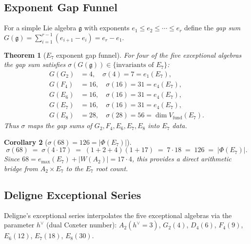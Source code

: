 \documentclass[11pt]{amsart}
\theoremstyle{plain}
\newtheorem{theorem}{Theorem}[section]
\newtheorem{corollary}[theorem]{Corollary}
\theoremstyle{definition}
\theoremstyle{remark}
\renewcommand{\Phi}{\varPhi}
\begin{document}
\subsection{Exponent Gap Funnel}\label{sec:exponent-gap}

For a simple Lie algebra $\mathfrak{g}$ with exponents
$e_1\le e_2\le\cdots\le e_r$ define the \emph{gap sum}
$G(\mathfrak{g})=\sum_{i=1}^{r-1}(e_{i+1}-e_i)=e_r-e_1$.

\begin{theorem}[$E_7$ exponent gap funnel]\label{thm:e7-funnel}
For four of the five exceptional algebras the gap sum satisfies
$\sigma(G(\mathfrak{g}))\in\{\text{invariants of }E_7\}$:
\begin{align*}
  G(G_2) &= 4,\quad \sigma(4)=7=e_1(E_7),\\
  G(F_4) &= 16,\quad \sigma(16)=31=e_4(E_7),\\
  G(E_6) &= 16,\quad \sigma(16)=31=e_4(E_7),\\
  G(E_7) &= 16,\quad \sigma(16)=31=e_4(E_7),\\
  G(E_8) &= 28,\quad \sigma(28)=56=\dim V_{\mathrm{fund}}(E_7).
\end{align*}
Thus $\sigma$ maps the gap sums of $G_2,F_4,E_6,E_7,E_8$ into $E_7$ data.
\end{theorem}

\begin{corollary}[$\sigma(68)=126=|\Phi(E_7)|$]\label{cor:sigma-68}
\[
  \sigma(68) \;=\; \sigma(4\cdot 17) \;=\; (1+2+4)(1+17) \;=\; 7\cdot 18 \;=\; 126 \;=\; |\Phi(E_7)|.
\]
Since $68=e_{\max}(E_7)+|W(A_2)|=17\cdot 4$, this provides a direct arithmetic
bridge from $A_2\times E_7$ to the $E_7$ root count.
\end{corollary}

\subsection{Deligne Exceptional Series}\label{sec:deligne}

Deligne's exceptional series interpolates the five exceptional algebras via
the parameter $h^{\vee}$ (dual Coxeter number):
$A_2(h^{\vee}=3)$, $G_2(4)$, $D_4(6)$, $F_4(9)$, $E_6(12)$, $E_7(18)$,
$E_8(30)$.
\end{document}
